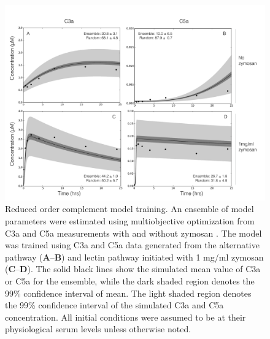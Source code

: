 \documentclass[12pt]{article}
\begin{document}
\begin{figure}[ht]
\centering
\includegraphics[width=1.0\textwidth]{./figs/Figure2_Fits_final_v2.pdf}
\caption{Reduced order complement model training.
An ensemble of model parameters were estimated using multiobjective optimization from C3a and C5a measurements with and without zymosan \cite{morad2015time}.
The model was trained using C3a and C5a data generated from the alternative pathway (\textbf{A}--\textbf{B}) and lectin pathway initiated with 1 mg/ml zymosan (\textbf{C}--\textbf{D}).
The solid black lines show the simulated mean value of C3a or C5a for the ensemble, while the dark shaded region denotes the 99\% confidence interval of mean.
The light shaded region denotes the 99\% confidence interval of the simulated C3a and C5a concentration.
All initial conditions were assumed to be at their physiological serum levels unless otherwise noted.
}\label{fig-fit}
\end{figure}
\end{document}
